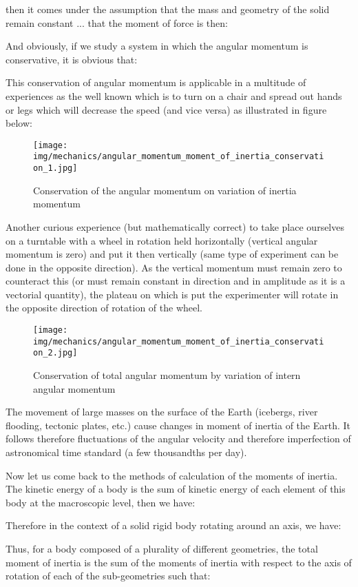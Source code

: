 	then it comes under the assumption that the mass and geometry of the solid remain constant ... that the moment of force is then:
	
	And obviously, if we study a system in which the angular momentum is conservative, it is obvious that:
	
	This conservation of angular momentum is applicable in a multitude of experiences as the well known which is to turn on a chair and spread out hands or legs which will decrease the speed (and vice versa) as illustrated in figure below:
	\begin{figure}[H]
		\centering
		\texttt{[image: img/mechanics/angular\_momentum\_moment\_of\_inertia\_conservation\_1.jpg]}
		\caption{Conservation of the angular momentum on variation of inertia momentum}
	\end{figure}
	Another curious experience (but mathematically correct) to take place ourselves on a turntable with a wheel in rotation held horizontally (vertical angular momentum is zero) and put it then vertically (same type of experiment can be done in the opposite direction). As the vertical momentum must remain zero to counteract this (or must remain constant in direction and in amplitude as it is a vectorial quantity), the plateau on which is put the experimenter will rotate in the opposite direction of rotation of the wheel.
	\begin{figure}[H]
		\centering
		\texttt{[image: img/mechanics/angular\_momentum\_moment\_of\_inertia\_conservation\_2.jpg]}
		\caption{Conservation of total angular momentum by variation of intern angular momentum}
	\end{figure}
	\begin{tcolorbox}[title=Remark,colframe=black,arc=10pt]
	The movement of large masses on the surface of the Earth (icebergs, river flooding, tectonic plates, etc.) cause changes in moment of inertia of the Earth. It follows therefore fluctuations of the angular velocity and therefore imperfection of astronomical time standard (a few thousandths per day).
	\end{tcolorbox}
	Now let us come back to the methods of calculation of the moments of inertia. The kinetic energy of a body is the sum of kinetic energy of each element of this body at the macroscopic level, then we have:
	
	Therefore in the context of a solid rigid body rotating around an axis, we have:
	
	Thus, for a body composed of a plurality of different geometries, the total moment of inertia is the sum of the moments of inertia with respect to the axis of rotation of each of the sub-geometries such that:
	
